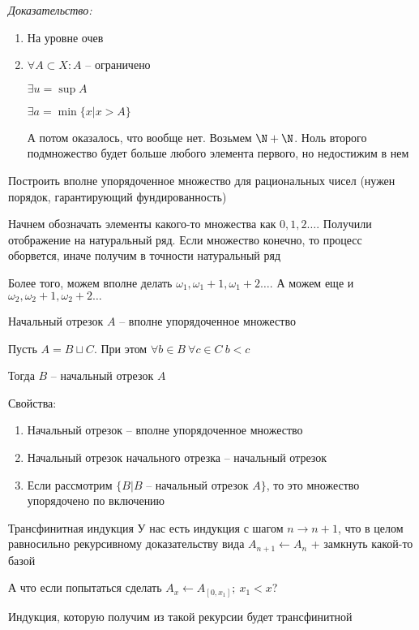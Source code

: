 \documentclass[12pt]{article}
\begin{document}
\textit{Доказательство:}

\begin{enumerate}
    \item На уровне очев 
    \item $\forall A \subset X : A$ -- ограничено 
    
    $\exists u = \sup A$

    $\exists a = \min \{ x | x > A \}$

    А потом оказалось, что вообще нет. Возьмем $\N + \N$. Ноль второго подмножество будет больше любого элемента первого, но недостижим в нем
\end{enumerate}

\begin{Exercise}{}
    Построить вполне упорядоченное множество для рациональных чисел (нужен порядок, гарантирующий фундированность)
\end{Exercise}

Начнем обозначать элементы какого-то множества как $0, 1, 2 \ldots$. Получили отображение на натуральный ряд. Если множество конечно, то процесс оборвется, иначе получим в точности натуральный ряд

Более того, можем вполне делать $\omega_1, \omega_1 + 1, \omega_1 + 2 \ldots$. А можем еще и $\omega_2, \omega_2 + 1, \omega_2 + 2 \ldots$

\begin{defin}{Начальный отрезок}
    $A$ -- вполне упорядоченное множество

    Пусть $A = B \sqcup C$. При этом $\forall b \in B\ \forall c \in C\ b < c$

    Тогда $B$ -- начальный отрезок $A$
\end{defin}

\begin{nota}{Свойства:}
    \begin{enumerate}
        \item Начальный отрезок -- вполне упорядоченное множество
        \item Начальный отрезок начального отрезка -- начальный отрезок
        \item Если рассмотрим $\{B | B \text{ -- начальный отрезок } A\}$, то это множество упорядочено по включению
    \end{enumerate}
\end{nota}

\begin{defin}{Трансфинитная индукция}
    У нас есть индукция с шагом $n \to n + 1$, что в целом равносильно рекурсивному доказательству вида $A_{n + 1} \leftarrow A_n$ + замкнуть какой-то базой

    А что если попытаться сделать $A_x \leftarrow A_{[0, x_1]};\ x_1 < x$?

    Индукция, которую получим из такой рекурсии будет трансфинитной 
\end{defin}
\end{document}

